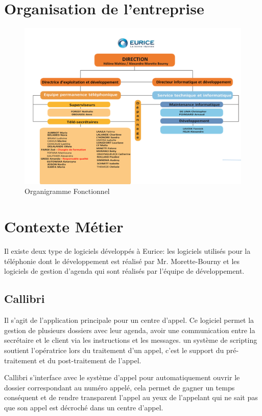 \section{Organisation de l'entreprise}
\begin{figure}[h]
	\centering
	\includegraphics[width=0.8\linewidth]{Images/organigramme_fonctionnel}
	\caption{Organigramme Fonctionnel}
	\label{fig:organigrammefonctionnel}
\end{figure}

\section{Contexte Métier}
Il existe deux type de logiciels développés à Eurice: 
les logiciels utilisés pour la téléphonie dont le développement est réalisé par Mr. Morette-Bourny 
et les logiciels de gestion d'agenda qui sont réalisés par l'équipe de développement. \newline


\subsection{Callibri}
Il s'agit de l'application principale pour un centre d'appel. 
Ce logiciel permet la gestion de plusieurs dossiers avec leur agenda, 
avoir une communication entre la secrétaire et le client via les instructions et les messages. 
un système de scripting soutient l'opératrice lors du traitement d'un appel, 
c'est le support du pré-traitement et du post-traitement de l'appel. \newline

\gls{Callibri} s'interface avec le système d'appel pour automatiquement ouvrir le dossier correspondant 
au numéro appelé, cela permet de gagner un temps conséquent 
et de rendre transparent l'appel au yeux de l'appelant qui ne sait pas 
que son appel est décroché dans un centre d'appel. \newline


